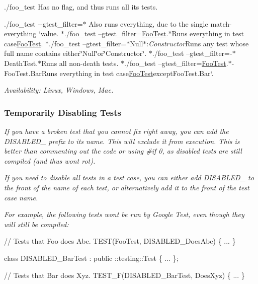 {\itshape 
\begin{DoxyItemize}
\item {\ttfamily ./foo\+\_\+test} Has no flag, and thus runs all its tests.
\item {\ttfamily ./foo\+\_\+test -\/-\/gtest\+\_\+filter=$\ast$} Also runs everything, due to the single match-\/everything `{\ttfamily value. $\ast$}./foo\+\_\+test --gtest\+\_\+filter=\hyperlink{class_foo_test}{Foo\+Test}.$\ast${\ttfamily Runs everything in test case}\hyperlink{class_foo_test}{Foo\+Test}{\ttfamily . $\ast$}./foo\+\_\+test --gtest\+\_\+filter=$\ast$\+Null$\ast$\+:{\itshape Constructor}{\ttfamily Runs any test whose full name contains either}\char`\"{}\+Null\char`\"{}{\ttfamily or}\char`\"{}\+Constructor\char`\"{}{\ttfamily . $\ast$}./foo\+\_\+test --gtest\+\_\+filter=-\/$\ast$\+Death\+Test.$\ast${\ttfamily Runs all non-\/death tests. $\ast$}./foo\+\_\+test --gtest\+\_\+filter=\hyperlink{class_foo_test}{Foo\+Test}.$\ast$-\/\+Foo\+Test.Bar{\ttfamily Runs everything in test case}\hyperlink{class_foo_test}{Foo\+Test}{\ttfamily except}Foo\+Test.\+Bar`.
\end{DoxyItemize}}

{\itshape {\itshape Availability\+:} Linux, Windows, Mac.}

{\itshape \subsubsection*{Temporarily Disabling Tests}}

{\itshape }

{\itshape If you have a broken test that you cannot fix right away, you can add the {\ttfamily D\+I\+S\+A\+B\+L\+E\+D\+\_\+} prefix to its name. This will exclude it from execution. This is better than commenting out the code or using {\ttfamily \#if 0}, as disabled tests are still compiled (and thus won\textquotesingle{}t rot).}

{\itshape If you need to disable all tests in a test case, you can either add {\ttfamily D\+I\+S\+A\+B\+L\+E\+D\+\_\+} to the front of the name of each test, or alternatively add it to the front of the test case name.}

{\itshape For example, the following tests won\textquotesingle{}t be run by Google Test, even though they will still be compiled\+:}

{\itshape 
\begin{DoxyCode}
// Tests that Foo does Abc.
TEST(FooTest, DISABLED\_DoesAbc) \{ ... \}

class DISABLED\_BarTest : public ::testing::Test \{ ... \};

// Tests that Bar does Xyz.
TEST\_F(DISABLED\_BarTest, DoesXyz) \{ ... \}
\end{DoxyCode}
}

